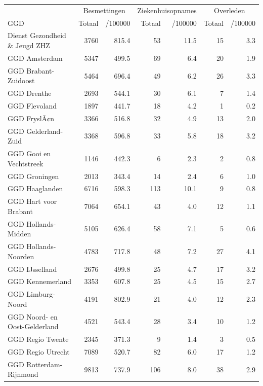 \documentclass[
  english,
  man,floatsintext]{apa6}
\begin{document}
\begin{table}
\centering\begingroup\fontsize{10}{12}\selectfont

\begin{threeparttable}
\begin{tabular}{lrrrrrr}
\toprule
\multicolumn{1}{c}{ } & \multicolumn{2}{c}{Besmettingen} & \multicolumn{2}{c}{Ziekenhuisopnames} & \multicolumn{2}{c}{Overleden} \\
\cmidrule(l{3pt}r{3pt}){2-3} \cmidrule(l{3pt}r{3pt}){4-5} \cmidrule(l{3pt}r{3pt}){6-7}
GGD & Totaal & /100000 & Totaal & /100000 & Totaal & /100000\\
\midrule
Dienst Gezondheid \& Jeugd ZHZ & 3760 & 815.4 & 53 & 11.5 & 15 & 3.3\\
GGD Amsterdam & 5347 & 499.5 & 69 & 6.4 & 20 & 1.9\\
GGD Brabant-Zuidoost & 5464 & 696.4 & 49 & 6.2 & 26 & 3.3\\
GGD Drenthe & 2693 & 544.1 & 30 & 6.1 & 7 & 1.4\\
GGD Flevoland & 1897 & 441.7 & 18 & 4.2 & 1 & 0.2\\
GGD FryslÃ¢n & 3366 & 516.8 & 32 & 4.9 & 13 & 2.0\\
GGD Gelderland-Zuid & 3368 & 596.8 & 33 & 5.8 & 18 & 3.2\\
GGD Gooi en Vechtstreek & 1146 & 442.3 & 6 & 2.3 & 2 & 0.8\\
GGD Groningen & 2013 & 343.4 & 14 & 2.4 & 6 & 1.0\\
GGD Haaglanden & 6716 & 598.3 & 113 & 10.1 & 9 & 0.8\\
GGD Hart voor Brabant & 7064 & 654.1 & 43 & 4.0 & 12 & 1.1\\
GGD Hollands-Midden & 5105 & 626.4 & 58 & 7.1 & 5 & 0.6\\
GGD Hollands-Noorden & 4783 & 717.8 & 48 & 7.2 & 27 & 4.1\\
GGD IJsselland & 2676 & 499.8 & 25 & 4.7 & 17 & 3.2\\
GGD Kennemerland & 3353 & 607.8 & 25 & 4.5 & 15 & 2.7\\
GGD Limburg-Noord & 4191 & 802.9 & 21 & 4.0 & 12 & 2.3\\
GGD Noord- en Oost-Gelderland & 4521 & 543.4 & 28 & 3.4 & 10 & 1.2\\
GGD Regio Twente & 2345 & 371.3 & 9 & 1.4 & 3 & 0.5\\
GGD Regio Utrecht & 7089 & 520.7 & 82 & 6.0 & 17 & 1.2\\
GGD Rotterdam-Rijnmond & 9813 & 737.9 & 106 & 8.0 & 38 & 2.9\\

\end{tabular}
\end{threeparttable}
\end{table}
\end{document}
